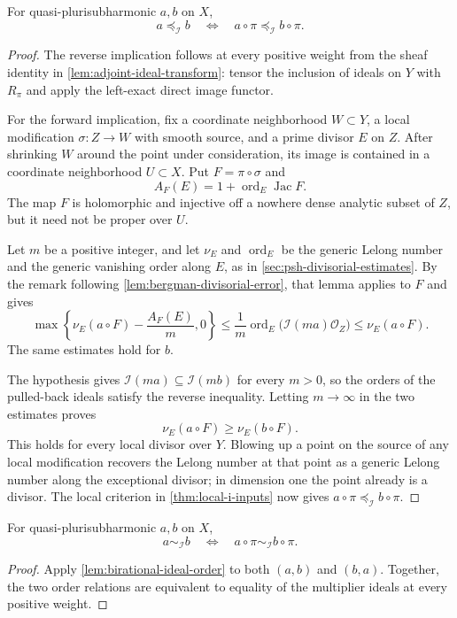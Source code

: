 \begin{lemma}\label{lem:birational-ideal-order}
For quasi-plurisubharmonic $a,b$ on $X$,
\[
 a\preceq_{\mathcal I}b
 \quad\Longleftrightarrow\quad
 a\circ\pi\preceq_{\mathcal I}b\circ\pi.
\]
\end{lemma}
\begin{proof}
The reverse implication follows at every positive weight from the sheaf identity in \cref{lem:adjoint-ideal-transform}: tensor the inclusion of ideals on $Y$ with $R_\pi$ and apply the left-exact direct image functor.

For the forward implication, fix a coordinate neighborhood $W\subset Y$, a local modification $\sigma\colon Z\to W$ with smooth source, and a prime divisor $E$ on $Z$. After shrinking $W$ around the point under consideration, its image is contained in a coordinate neighborhood $U\subset X$. Put $F=\pi\circ\sigma$ and
\[
 A_F(E)=1+\operatorname{ord}_E\operatorname{Jac}F.
\]
The map $F$ is holomorphic and injective off a nowhere dense analytic subset of $Z$, but it need not be proper over $U$.

Let $m$ be a positive integer, and let $\nu_E$ and $\operatorname{ord}_E$ be the generic Lelong number and the generic vanishing order along $E$, as in \cref{sec:psh-divisorial-estimates}. By the remark following \cref{lem:bergman-divisorial-error}, that lemma applies to $F$ and gives
\[
 \max\left\{\nu_E(a\circ F)-\frac{A_F(E)}m,0\right\}
 \leq \frac1m\operatorname{ord}_E\bigl(\mathcal I(ma)\mathcal O_Z\bigr)
 \leq\nu_E(a\circ F).
\]
The same estimates hold for $b$.

The hypothesis gives $\mathcal I(ma)\subseteq\mathcal I(mb)$ for every $m>0$, so the orders of the pulled-back ideals satisfy the reverse inequality. Letting $m\to\infty$ in the two estimates proves
\[
 \nu_E(a\circ F)\geq\nu_E(b\circ F).
\]
This holds for every local divisor over $Y$. Blowing up a point on the source of any local modification recovers the Lelong number at that point as a generic Lelong number along the exceptional divisor; in dimension one the point already is a divisor. The local criterion in \cref{thm:local-i-inputs} now gives $a\circ\pi\preceq_{\mathcal I}b\circ\pi$.
\end{proof}

\begin{lemma}\label{lem:ideal-equivalence-modification}
For quasi-plurisubharmonic $a,b$ on $X$,
\[
 a\sim_{\mathcal I}b
       \quad\Longleftrightarrow\quad
 a\circ\pi\sim_{\mathcal I}b\circ\pi.
\]
\end{lemma}
\begin{proof}
Apply \cref{lem:birational-ideal-order} to both $(a,b)$ and $(b,a)$. Together, the two order relations are equivalent to equality of the multiplier ideals at every positive weight.
\end{proof}


